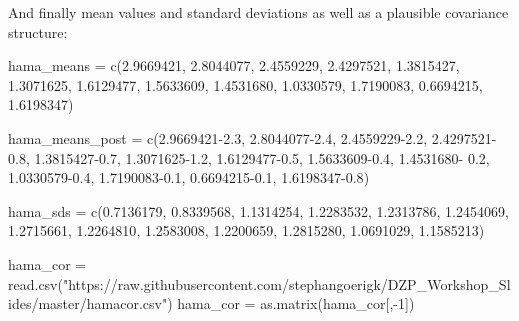 \documentclass[
]{book}
\newenvironment{Shaded}{\begin{snugshade}}{\end{snugshade}}
\newcommand{\DecValTok}[1]{\textcolor[rgb]{0.00,0.00,0.81}{#1}}
\newcommand{\FloatTok}[1]{\textcolor[rgb]{0.00,0.00,0.81}{#1}}
\newcommand{\FunctionTok}[1]{\textcolor[rgb]{0.00,0.00,0.00}{#1}}
\newcommand{\NormalTok}[1]{#1}
\newcommand{\OtherTok}[1]{\textcolor[rgb]{0.56,0.35,0.01}{#1}}
\newcommand{\SpecialCharTok}[1]{\textcolor[rgb]{0.00,0.00,0.00}{#1}}
\newcommand{\StringTok}[1]{\textcolor[rgb]{0.31,0.60,0.02}{#1}}
\begin{document}
And finally mean values and standard deviations as well as a plausible covariance structure:

\begin{Shaded}
\begin{Highlighting}[]
\NormalTok{hama\_means }\OtherTok{=} \FunctionTok{c}\NormalTok{(}\FloatTok{2.9669421}\NormalTok{,}
               \FloatTok{2.8044077}\NormalTok{,}
               \FloatTok{2.4559229}\NormalTok{,}
               \FloatTok{2.4297521}\NormalTok{,}
               \FloatTok{1.3815427}\NormalTok{,}
               \FloatTok{1.3071625}\NormalTok{,}
               \FloatTok{1.6129477}\NormalTok{,}
               \FloatTok{1.5633609}\NormalTok{,}
               \FloatTok{1.4531680}\NormalTok{,}
               \FloatTok{1.0330579}\NormalTok{,}
               \FloatTok{1.7190083}\NormalTok{,}
               \FloatTok{0.6694215}\NormalTok{,}
               \FloatTok{1.6198347}\NormalTok{)}

\NormalTok{hama\_means\_post }\OtherTok{=} \FunctionTok{c}\NormalTok{(}\FloatTok{2.9669421{-}2.3}\NormalTok{,}
                    \FloatTok{2.8044077{-}2.4}\NormalTok{,}
                    \FloatTok{2.4559229{-}2.2}\NormalTok{,}
                    \FloatTok{2.4297521{-}0.8}\NormalTok{,}
                    \FloatTok{1.3815427{-}0.7}\NormalTok{,}
                    \FloatTok{1.3071625{-}1.2}\NormalTok{,}
                    \FloatTok{1.6129477{-}0.5}\NormalTok{,}
                    \FloatTok{1.5633609{-}0.4}\NormalTok{,}
                    \FloatTok{1.4531680}\SpecialCharTok{{-}} \FloatTok{0.2}\NormalTok{,}
                    \FloatTok{1.0330579{-}0.4}\NormalTok{,}
                    \FloatTok{1.7190083{-}0.1}\NormalTok{,}
                    \FloatTok{0.6694215{-}0.1}\NormalTok{,}
                    \FloatTok{1.6198347{-}0.8}\NormalTok{)}

\NormalTok{hama\_sds }\OtherTok{=} \FunctionTok{c}\NormalTok{(}\FloatTok{0.7136179}\NormalTok{,}
             \FloatTok{0.8339568}\NormalTok{,}
             \FloatTok{1.1314254}\NormalTok{,}
             \FloatTok{1.2283532}\NormalTok{,}
             \FloatTok{1.2313786}\NormalTok{,}
             \FloatTok{1.2454069}\NormalTok{,}
             \FloatTok{1.2715661}\NormalTok{,}
             \FloatTok{1.2264810}\NormalTok{,}
             \FloatTok{1.2583008}\NormalTok{,}
             \FloatTok{1.2200659}\NormalTok{,}
             \FloatTok{1.2815280}\NormalTok{,}
             \FloatTok{1.0691029}\NormalTok{,}
             \FloatTok{1.1585213}\NormalTok{)}

\NormalTok{hama\_cor }\OtherTok{=} \FunctionTok{read.csv}\NormalTok{(}\StringTok{"https://raw.githubusercontent.com/stephangoerigk/DZP\_Workshop\_Slides/master/hamacor.csv"}\NormalTok{)}
\NormalTok{hama\_cor }\OtherTok{=} \FunctionTok{as.matrix}\NormalTok{(hama\_cor[,}\SpecialCharTok{{-}}\DecValTok{1}\NormalTok{])}
\end{Highlighting}
\end{Shaded}
\end{document}
